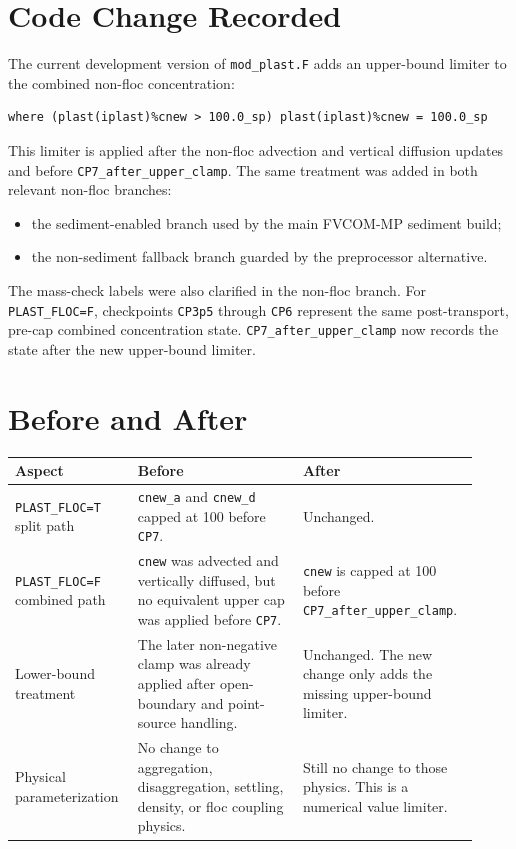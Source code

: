 \documentclass[11pt]{article}
\begin{document}
\section*{Code Change Recorded}

The current development version of \texttt{mod\_plast.F} adds an upper-bound
limiter to the combined non-floc concentration:
\begin{verbatim}
where (plast(iplast)%cnew > 100.0_sp) plast(iplast)%cnew = 100.0_sp
\end{verbatim}

This limiter is applied after the non-floc advection and vertical diffusion
updates and before \texttt{CP7\_after\_upper\_clamp}.  The same treatment was
added in both relevant non-floc branches:
\begin{itemize}
  \item the sediment-enabled branch used by the main FVCOM-MP sediment build;
  \item the non-sediment fallback branch guarded by the preprocessor
  alternative.
\end{itemize}

The mass-check labels were also clarified in the non-floc branch.  For
\texttt{PLAST\_FLOC=F}, checkpoints \texttt{CP3p5} through \texttt{CP6}
represent the same post-transport, pre-cap combined concentration state.
\texttt{CP7\_after\_upper\_clamp} now records the state after the new
upper-bound limiter.

\section*{Before and After}

\begin{center}
\begin{tabular}{p{0.24\linewidth}p{0.34\linewidth}p{0.34\linewidth}}
\toprule
Aspect & Before & After \\
\midrule
\texttt{PLAST\_FLOC=T} split path &
\texttt{cnew\_a} and \texttt{cnew\_d} capped at 100 before
\texttt{CP7}. &
Unchanged. \\
\addlinespace
\texttt{PLAST\_FLOC=F} combined path &
\texttt{cnew} was advected and vertically diffused, but no equivalent
upper cap was applied before \texttt{CP7}. &
\texttt{cnew} is capped at 100 before
\texttt{CP7\_after\_upper\_clamp}. \\
\addlinespace
Lower-bound treatment &
The later non-negative clamp was already applied after open-boundary and
point-source handling. &
Unchanged.  The new change only adds the missing upper-bound limiter. \\
\addlinespace
Physical parameterization &
No change to aggregation, disaggregation, settling, density, or floc
coupling physics. &
Still no change to those physics.  This is a numerical value limiter. \\
\bottomrule
\end{tabular}
\end{center}
\end{document}
